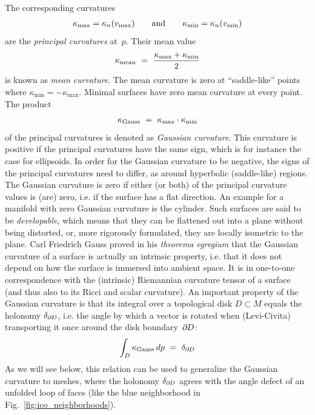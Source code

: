 The corresponding curvatures
\begin{align}
    \kappa_{\max} = \kappa_n(v_{\max})
    \qquad \textup{and} \qquad
    \kappa_{\min} = \kappa_n(v_{\min})
\end{align}
are the \emph{principal curvatures} at~$p$.
Their mean value
\begin{align}\label{eq:mean_curvature}
    \kappa_{\textup{mean}} \ =\ \frac{\kappa_{\max}+\kappa_{\min}}{2}
\end{align}
is known as \emph{mean curvature}.
The mean curvature is zero at ``saddle-like'' points where $\kappa_{\min} = -\kappa_{\max}$.
Minimal surfaces have zero mean curvature at every point.
The product
\begin{align}
    \kappa_{\textup{Gauss}}\ =\ \kappa_{\max} \cdot \kappa_{\min}
\end{align}
of the principal curvatures is denoted as \emph{Gaussian curvature}.
This curvature is positive if the principal curvatures have the same sign, which is for instance the case for ellipsoids.
In order for the Gaussian curvature to be negative, the signs of the principal curvatures need to differ, as around hyperbolic (saddle-like) regions.
The Gaussian curvature is zero if either (or both) of the principal curvature values is (are) zero, i.e. if the surface has a flat direction.
An example for a manifold with zero Gaussian curvature is the cylinder.
Such surfaces are said to be \emph{developable}, which means that they can be flattened out into a plane without being distorted, or, more rigorously formulated, they are locally isometric to the plane.
Carl Friedrich Gauss proved in his \emph{theorema egregium} that the Gaussian curvature of a surface is actually an intrinsic property, i.e. that it does not depend on how the surface is immersed into ambient space.
It is in one-to-one correspondence with the (intrinsic) Riemannian curvature tensor of a surface (and thus also to its Ricci and scalar curvature).
An important property of the Gaussian curvature is that its integral over a topological disk $D \subset M$ equals the holonomy $\delta_{\partial\mkern-1mu D}$, i.e. the angle by which a vector is rotated when (Levi-Civita) transporting it once around the disk boundary~$\partial\mkern-1mu D$:
\begin{align}\label{eq:gauss_curvature_holonomy_smooth}
    \int_{D} \kappa_{\textup{Gauss}}\, dp\ =\ \delta_{\partial\mkern-1mu D}
\end{align}
As we will see below, this relation can be used to generalize the Gaussian curvature to meshes, where the holonomy $\delta_{\partial\mkern-1mu D}$ agrees with the angle defect of an unfolded loop of faces (like the blue neighborhood in Fig.~\ref{fig:ico_neighborhoods}).

